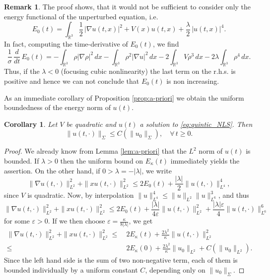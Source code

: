 \documentclass[a4paper,leqno]{amsart}
\theoremstyle{plain}
\newtheorem{corollary}[theorem]{Corollary}
\theoremstyle{definition}
\newtheorem{remark}[theorem]{Remark}
\numberwithin{equation}{section}
\begin{document}
\begin{remark} The proof shows, that it would not be sufficient to consider only the energy functional
of the unperturbed equation, i.e.
\begin{equation*}
E_0(t)=\int_{{{\mathbb R}}^3}\frac{1}{2}\, |\nabla u(t,x)|^2+ V(x) u(t,x) + \frac{\lambda}{2}\, |u(t,x)|^4.
\end{equation*}
In fact, computing the
time-derivative of $E_0(t)$, we find
\begin{equation*}
\frac{1}{\sigma}\, \frac{d}{d t} \, E_0(t)=- \int_{{{\mathbb R}}^3}\rho|\nabla\rho|^2\, d x- \int_{{{\mathbb R}}^3}\rho^2|\nabla u |^2\, d x
-2 \int_{{{\mathbb R}}^3}V \rho^3\, d x
-2\lambda \int_{{{\mathbb R}}^3}\rho^4\, d x.
\end{equation*}
Thus, if the $\lambda <0$ (focusing cubic nonlinearity) the last term on the r.h.s.
is positive and hence we can not conclude that $E_0(t)$ is non increasing.
\end{remark}

As an immediate corollary of Proposition \ref{prop:a-priori} we obtain the uniform boundedness of the energy norm of $u(t)$.

\begin{corollary} \label{cor:a-priori}
Let $V$ be quadratic and $u(t)$ a solution to \eqref{eq:quintic_NLS}. Then
\begin{equation*}
\| u(t, \cdot) \|_{\Sigma} {\leqslant} C(\| u_0 \|_{\Sigma}),\quad \forall \, t {\geqslant} 0.
\end{equation*}
\end{corollary}
\begin{proof} We already know from Lemma \ref{lem:a-priori} that the $L^2$ norm of $u(t)$ is bounded. If $\lambda >0$ then the uniform bound on $E_\kappa(t)$
immediately yields the assertion. On the other hand, if $0>\lambda = - |\lambda|$, we write
\begin{equation*}
\|\nabla u(t, \cdot)\|_{L^2}^2 + \| x  u(t, \cdot)\|_{L^2}^2  {\leqslant} 2 E_0(t)+\frac{|\lambda|}{2}\|u (t, \cdot)\|_{L^4}^4,
\end{equation*}
since $V$ is quadratic. Now, by interpolation $\|u \|_{L^4}^4{\leqslant} \| u \|_{L^2}\| u \|_{L^6}^3$, and thus
\begin{equation*}
\|\nabla u(t, \cdot)\|_{L^2}^2+ \| x  u(t, \cdot) \|_{L^2}^2 {\leqslant} 2 E_0 (t)+\frac{|\lambda|}{4{\varepsilon}}\|u (t, \cdot)\|_{L^2}^2
+\frac{ |\lambda| {\varepsilon}}{4}\|u(t, \cdot)\|_{L^6}^6
\end{equation*}
for some ${\varepsilon} > 0$. If we then choose ${\varepsilon}=\frac{\kappa}{8 |\lambda|}$, we get
\begin{align*}
\|\nabla u(t, \cdot) \|_{L^2}^2  + \| x  u(t, \cdot) \|_{L^2}^2{\leqslant} & \ 2 E_\kappa (t)+\frac{2\lambda^2}{\kappa}\| u (t, \cdot)\|_{L^2}^2 \\
{\leqslant} & \  2 E_\kappa(0)+\frac{2\lambda^2}{\kappa} \| u_0\|_{L^2}+C(\|u_0\|_{L^2}).
\end{align*}
Since the left hand side is the sum of two non-negative term, each of them is bounded individually by a uniform constant $C$, depending only on $ \| u_0 \|_\Sigma$.
\end{proof}
\end{document}
